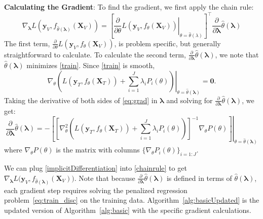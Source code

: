 \documentclass[10pt,letterpaper]{article}
\newcommand*{\vertbar}{\rule[-1ex]{0.5pt}{2.5ex}}
\begin{document}
\noindent
\textbf{Calculating the Gradient}:
To find the gradient, we first apply the chain rule:
\begin{equation}
\nabla_{\boldsymbol{\lambda}} L \left( \boldsymbol{y}_V, f_{\hat{\theta}(\boldsymbol{\lambda})}(\boldsymbol{X}_V) \right ) = 
\left [
\left . \frac{\partial}{\partial \theta} L ( \boldsymbol{y}_V, f_{\theta}(\boldsymbol{X}_V)) \right |_{\theta=\hat{\theta}(\lambda)}
\right ]^\top 
\frac{\partial}{\partial \boldsymbol{\lambda}} \hat{\theta}(\boldsymbol{\lambda})
\label{chainrule}
\end{equation}
The first term, $\frac{\partial}{\partial \theta} L ( \boldsymbol{y}_V, f_{\theta}(\boldsymbol{X}_V))$, is problem specific, but generally straightforward to calculate. To calculate the second term, $\frac{\partial}{\partial \boldsymbol{\lambda}} \hat{\theta}(\boldsymbol{\lambda})$, we note that $\hat{\theta}(\boldsymbol{\lambda})$ minimizes \eqref{train}. Since \eqref{train} is smooth,
\begin{equation}
\nabla_\theta 
\left . \left (
L(\boldsymbol{y}_T, f_\theta (\boldsymbol{X}_T)) +
\sum\limits_{i=1}^J \lambda_i P_i(\theta)
\right ) \right |_{\theta = \hat \theta(\boldsymbol{\lambda})}
= \boldsymbol{0}.
\label{eq:grad}
\end{equation}
Taking the derivative of both sides of \eqref{eq:grad} in $\boldsymbol{\lambda}$ and solving for $\frac{\partial}{\partial \boldsymbol{\lambda}} \hat{\theta}(\boldsymbol{\lambda})$, we get:
\begin{equation}
\frac{\partial}{\partial \boldsymbol{\lambda}} \hat{\theta}(\boldsymbol{\lambda}) = 
- \left . \left [ \left [
 \nabla_\theta^2 \left (  L \left (\boldsymbol{y}_T, f_\theta (\boldsymbol{X}_T) \right)  +  \sum\limits_{i=1}^J \lambda_i P_i(\theta)  \right )  \right ]^{-1}
\nabla_\theta P(\theta)
\right ]
\right |_{\theta = \hat \theta(\boldsymbol{\lambda})}
\label{implicitDifferentiation}
\end{equation}
where $\nabla_\theta P(\theta)$ is the matrix with columns $\{\nabla_\theta P_i(\theta)\}_{i=1:J}$.

We can plug \eqref{implicitDifferentiation} into \eqref{chainrule} to get $\nabla_{\boldsymbol{\lambda}} L \Big( \boldsymbol{y}_V, f_{\hat{\theta}(\boldsymbol{\lambda})}(\boldsymbol{X}_V) \Big )$. Note that because $\frac{\partial}{\partial \boldsymbol{\lambda}} \hat{\theta}(\boldsymbol{\lambda})$ is defined in terms of $\hat{\theta}\left(\boldsymbol{\lambda}\right)$, each gradient step requires solving the penalized regression problem~\eqref{eq:train_disc} on the training data. Algorithm~\ref{alg:basicUpdated} is the updated version of Algorithm~\ref{alg:basic} with the specific gradient calculations.
\end{document}
